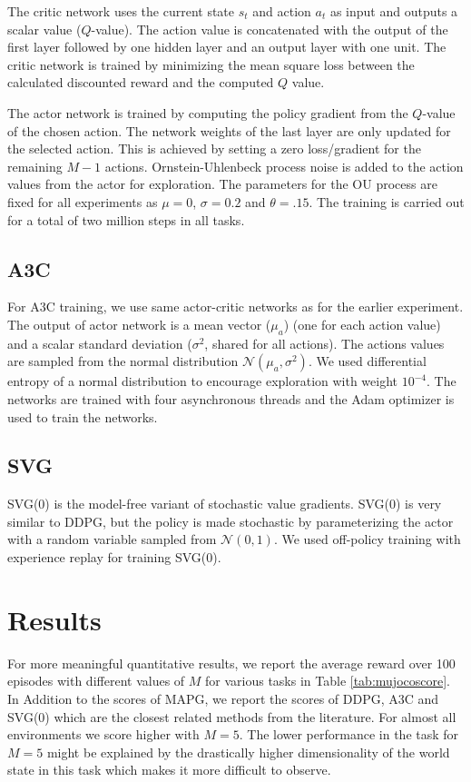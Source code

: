 The critic network uses the current state $s_t$ and action $a_t$ as input and outputs a scalar value ($Q$-value). The action value is concatenated with the output of the first layer followed by one hidden layer and an output layer with one unit. The critic network is trained by minimizing the mean square loss between the calculated discounted reward and the computed $Q$ value. 

The actor network is trained by computing the policy gradient from the $Q$-value of the chosen action. The network weights of the last layer are only updated for the selected action. This is achieved by setting a zero loss/gradient for the remaining $M-1$ actions. 
Ornstein-Uhlenbeck process noise is added to the action values from the actor for exploration. The parameters for the OU process are fixed for all experiments as $\mu=0$, $\sigma=0.2$ and $\theta=.15$. The training is carried out for a total of two million steps in all tasks.

\subsection{A3C}
For A3C training, we use same actor-critic networks as for the earlier experiment. The output of actor network is a mean vector ($\mu_a$) (one for each action value) and a scalar standard deviation ($\sigma^2$, shared for all actions). The actions values are sampled from the normal distribution $\mathcal{N}(\mu_a, \sigma^2)$. We used differential entropy of a normal distribution to encourage exploration with weight $10^{-4}$. The networks are trained with four asynchronous threads and the Adam optimizer is used to train the networks.

\subsection{SVG}
SVG(0) is the model-free variant of stochastic value gradients. SVG(0) is very similar to DDPG, but the policy is made stochastic by parameterizing the actor with a random variable sampled from $\mathcal{N}(0, 1)$. We used off-policy training with experience replay for training SVG(0).


\section{Results}
For more meaningful quantitative results, we report the average reward over 100 episodes with different values of $M$ for various tasks in Table \ref{tab:mujocoscore}. In Addition to the scores of MAPG, we report the scores of DDPG, A3C and SVG(0) which are the closest related methods from the literature. 
For almost all environments we score higher with $M=5$. 
The lower performance in the  task for $M=5$ might be explained by the drastically higher dimensionality of the world state in this task which makes it more difficult to observe.

